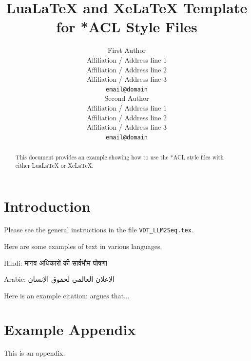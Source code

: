 \documentclass[11pt]{article}
\title{LuaLaTeX and XeLaTeX Template for *ACL Style Files}
\author{First Author \\
  Affiliation / Address line 1 \\
  Affiliation / Address line 2 \\
  Affiliation / Address line 3 \\
  \texttt{email@domain} \\\And
  Second Author \\
  Affiliation / Address line 1 \\
  Affiliation / Address line 2 \\
  Affiliation / Address line 3 \\
  \texttt{email@domain} \\}
\begin{document}
\maketitle
\begin{abstract}
This document provides an example showing how
to use the *ACL style files with either
LuaLaTeX or XeLaTeX.
\end{abstract}


\section{Introduction}

Please see the general instructions
in the file \verb|VDT_LLM2Seq.tex|.

Here are some examples of text in various languages.

Hindi: \foreignlanguage{hindi}{मानव अधिकारों की सार्वभौम घोषणा}

Arabic: \foreignlanguage{arabic}{الإعلان العالمي لحقوق الإنسان}

Here is an example citation:
\citet{Gusfield:97} argues that...




\appendix

\section{Example Appendix}
\label{sec:appendix}

This is an appendix.
\end{document}

